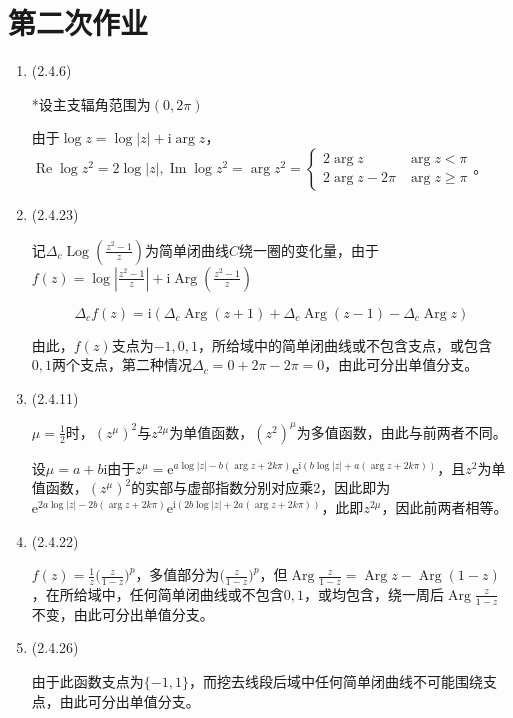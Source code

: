 \documentclass[a4paper,UTF8,fontset=windows]{ctexart}
\DeclareMathOperator{\Arg}{Arg}
\DeclareMathOperator{\im}{Im}
\DeclareMathOperator{\Log}{Log}
\DeclareMathOperator{\re}{Re}
\begin{document}
\section{第二次作业}
\begin{enumerate}
    \item (2.4.6)
    
    *设主支辐角范围为$(0,2\pi)$
    
    由于$\log z=\log|z|+\mathrm{i}\arg z$，$\re\log z^2=2\log|z|,\im\log z^2=\arg z^2=\begin{cases}2\arg z&\arg z<\pi\\2\arg z-2\pi&\arg z\ge\pi\end{cases}$。
    
    \item (2.4.23)
    
    记$\Delta_c\Log\left(\frac{z^2-1}{z}\right)$为简单闭曲线$C$绕一圈的变化量，由于$f(z)=\log\left|\frac{z^2-1}{z}\right|+\mathrm{i}\Arg\left(\frac{z^2-1}{z}\right)$
    
    \[\Delta_cf(z)=\mathrm{i}(\Delta_c\Arg(z+1)+\Delta_c\Arg(z-1)-\Delta_c\Arg z)\]
    
    由此，$f(z)$支点为$-1,0,1$，所给域中的简单闭曲线或不包含支点，或包含$0,1$两个支点，第二种情况$\Delta_c=0+2\pi-2\pi=0$，由此可分出单值分支。
    
    \item (2.4.11)
    
    $\mu=\frac{1}{2}$时，$(z^\mu)^2$与$z^{2\mu}$为单值函数，$(z^2)^\mu$为多值函数，由此与前两者不同。
    
    设$\mu=a+b\mathrm{i}$由于$z^\mu=\mathrm{e}^{a\log|z|-b(\arg z+2k\pi)}\mathrm{e}^{\mathrm{i}(b\log|z|+a(\arg z+2k\pi))}$，且$z^2$为单值函数，$(z^\mu)^2$的实部与虚部指数分别对应乘2，因此即为$\mathrm{e}^{2a\log|z|-2b(\arg z+2k\pi)}\mathrm{e}^{\mathrm{i}(2b\log|z|+2a(\arg z+2k\pi))}$，此即$z^{2\mu}$，因此前两者相等。
    
    \item (2.4.22)
    
    $f(z)=\frac{1}{z}\big(\frac{z}{1-z}\big)^p$，多值部分为$\big(\frac{z}{1-z}\big)^p$，但$\Arg\frac{z}{1-z}=\Arg z-\Arg(1-z)$，在所给域中，任何简单闭曲线或不包含$0,1$，或均包含，绕一周后$\Arg\frac{z}{1-z}$不变，由此可分出单值分支。
    
    \item (2.4.26)
    
    由于此函数支点为$\{-1,1\}$，而挖去线段后域中任何简单闭曲线不可能围绕支点，由此可分出单值分支。
    

\end{enumerate}
\end{document}

